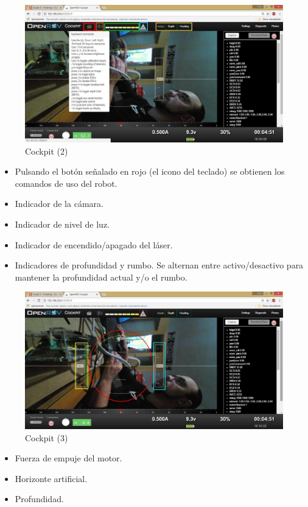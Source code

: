 \begin{figure} [hbtp]
\begin{center}
  \includegraphics[width=15cm]{img/cap3/3_5/cockpit2_v2}
\end{center}
\caption{Cockpit (2)}
\label{fig:cockpit2}
\end{figure}

\begin{itemize}
\item[\textcolor{red}{\textbullet}]Pulsando el botón señalado en rojo (el icono del teclado) se obtienen los comandos de uso del robot.
\item[\textcolor{orange}{\textbullet}]Indicador de la cámara.
\item[\textcolor{green}{\textbullet}]Indicador de nivel de luz.
\item[\textcolor{blue}{\textbullet}]Indicador de encendido/apagado del láser.
\item[\textcolor{yellow}{\textbullet}]Indicadores de profundidad y rumbo. Se alternan entre activo/desactivo para mantener la profundidad actual y/o el rumbo.
\end{itemize}


\newpage
\begin{figure} [hbtp]
\begin{center}
  \includegraphics[width=15cm]{img/cap3/3_5/cockpit3_v2}
\end{center}
\caption{Cockpit (3)}
\label{fig:cockpit3}
\end{figure}
\begin{itemize}
\item[\textcolor{yellow}{\textbullet}]Fuerza de empuje del motor.
\item[\textcolor{red}{\textbullet}]Horizonte artificial.
\item[\textcolor{green}{\textbullet}]Profundidad.
\end{itemize}

